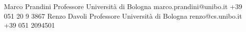 %
%
%


\begin{referees}
		{Marco Prandini}
		{Professore}
		{Universit\`a di Bologna}
		{marco.prandini@unibo.it}
		{+39 051 20 9 3867}
		{Renzo Davoli}
		{Professore}
		{Universit\`a di Bologna}
		{renzo@cs.unibo.it}
		{+39 051 2094501}

\end{referees}
